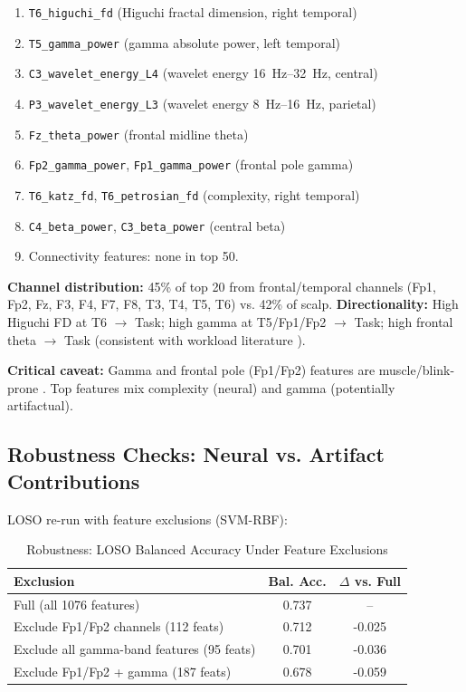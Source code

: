 \documentclass[conference]{IEEEtran}
\begin{document}
\begin{enumerate}
    \item \texttt{T6\_higuchi\_fd} (Higuchi fractal dimension, right temporal)
    \item \texttt{T5\_gamma\_power} (gamma absolute power, left temporal)
    \item \texttt{C3\_wavelet\_energy\_L4} (wavelet energy \SIrange{16}{32}{\hertz}, central)
    \item \texttt{P3\_wavelet\_energy\_L3} (wavelet energy \SIrange{8}{16}{\hertz}, parietal)
    \item \texttt{Fz\_theta\_power} (frontal midline theta)
    \item \texttt{Fp2\_gamma\_power}, \texttt{Fp1\_gamma\_power} (frontal pole gamma)
    \item \texttt{T6\_katz\_fd}, \texttt{T6\_petrosian\_fd} (complexity, right temporal)
    \item \texttt{C4\_beta\_power}, \texttt{C3\_beta\_power} (central beta)
    \item Connectivity features: none in top 50.
\end{enumerate}

\textbf{Channel distribution:} 45\% of top 20 from frontal/temporal channels (Fp1, Fp2, Fz, F3, F4, F7, F8, T3, T4, T5, T6) vs. 42\% of scalp. \textbf{Directionality:} High Higuchi FD at T6 $\rightarrow$ Task; high gamma at T5/Fp1/Fp2 $\rightarrow$ Task; high frontal theta $\rightarrow$ Task (consistent with workload literature \cite{chikhi2022eeg, katahira2018eeg}).

\textbf{Critical caveat:} Gamma and frontal pole (Fp1/Fp2) features are muscle/blink-prone \cite{puce2017review}. Top features mix complexity (neural) and gamma (potentially artifactual).

\subsection{Robustness Checks: Neural vs. Artifact Contributions}
\label{sec:robustness}
LOSO re-run with feature exclusions (SVM-RBF):

\begin{table}[htbp]
\caption{Robustness: LOSO Balanced Accuracy Under Feature Exclusions}
\label{tab:robustness}
\centering
\begin{tabular}{@{}lcc@{}}
\toprule
Exclusion & Bal. Acc. & $\Delta$ vs. Full \\
\midrule
Full (all \num{1076} features) & 0.737 & -- \\
Exclude Fp1/Fp2 channels (\num{112} feats) & 0.712 & -0.025 \\
Exclude all gamma-band features (\num{95} feats) & 0.701 & -0.036 \\
Exclude Fp1/Fp2 + gamma (\num{187} feats) & 0.678 & -0.059 \\
\bottomrule
\end{tabular}
\end{table}
\end{document}
